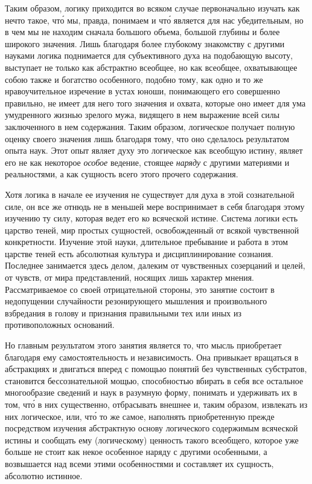 Таким образом, логику приходится во всяком случае первоначально изучать как
нечто такое, чт\'{о} мы, правда, понимаем и чт\'{о} является для нас
убедительным,
но в чем мы не находим сначала большого объема, большой глубины и более
широкого значения. Лишь благодаря более глубокому знакомству с другими
науками логика поднимается для субъективного духа на подобающую высоту,
выступает не только как абстрактно всеобщее, но как всеобщее, охватывающее
собою также и богатство особенного, подобно тому, как одно и то же
нравоучительное изречение в устах юноши, понимающего его совершенно
правильно, не имеет для него того значения и охвата, которые оно имеет для
ума умудренного жизнью зрелого мужа, видящего в нем выражение всей силы
заключенного в нем содержания. Таким образом, логическое получает полную
оценку своего значения лишь благодаря тому, что оно сделалось результатом
опыта наук. Этот опыт являет духу это логическое как всеобщую истину,
являет его не как некоторое {\em особое} ведение,
стоящее {\em наряду} с другими материями и
реальностями, а как сущность всего этого прочего содержания.

Хотя логика в начале ее изучения не существует для духа в этой сознательной
силе, он все же отнюдь не в меньшей мере воспринимает в себя благодаря
этому изучению ту силу, которая ведет его ко всяческой истине. Система
логики есть царство теней, мир простых сущностей, освобожденный от всякой
чувственной конкретности. Изучение этой науки, длительное пребывание и
работа в этом царстве теней есть абсолютная культура и дисциплинирование
сознания. Последнее занимается здесь делом, далеким от чувственных
созерцаний и целей, от чувств, от мира представлений, носящих лишь характер
мнения. Рассматриваемое со своей отрицательной стороны, это занятие состоит
в недопущении случайности резонирующего мышления и произвольного
взбредания в голову и признания правильными тех или иных из
противоположных оснований.

Но главным результатом этого занятия является то, что мысль приобретает
благодаря ему самостоятельность и независимость. Она привыкает вращаться в
абстракциях и двигаться вперед с помощью понятий без чувственных
субстратов, становится бессознательной мощью, способностью вбирать в себя
все остальное многообразие сведений и наук в разумную форму, понимать и
удерживать их в том, чт\'{о} в них существенно, отбрасывать внешнее и, таким
образом, извлекать из них логическое, или, чт\'{о} то же самое, наполнять
приобретенную прежде посредством изучения абстрактную основу логического
содержимым всяческой истины и сообщать ему (логическому) ценность такого
всеобщего, которое уже больше не стоит как некое особенное наряду с другими
особенными, а возвышается над всеми этими особенностями и составляет их
сущность, абсолютно истинное.

